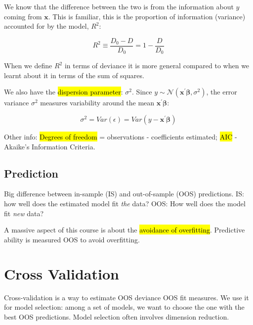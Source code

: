 \documentclass[11pt]{article}
\begin{document}
We know that the difference between the two is from the information about $y$ coming from $\mathbf{x}$. This is familiar, this is the proportion of information (variance) accounted for by the model, $R^2$:

\begin{equation}
    \label{eq:r2}
    R^2 \equiv \dfrac{D_0 - D}{D_0} = 1 - \dfrac{D}{D_0}
\end{equation}

When we define $R^2$ in terms of deviance it is more general compared to when we learnt about it in terms of the sum of squares.

We also have the \hl{dispersion parameter}: $\sigma^2$. Since $y \sim \mathcal{N}(\mathbf{x^\prime}\bm{\beta}, \sigma^2)$, the error variance $\sigma^2$ measures variability around the mean $\mathbf{x^\prime}\bm{\beta}$:

\begin{equation*}
    \sigma^2 = Var(\epsilon) = Var(y - \mathbf{x^\prime}\bm{\beta})
\end{equation*}

\begin{note}
    Other info: \hl{Degrees of freedom} = observations - coefficients estimated; \hl{AIC} - Akaike's Information Criteria.
\end{note}

\subsection{Prediction}
\begin{note}
    Big difference between in-sample (IS) and out-of-sample (OOS) predictions. IS: how well does the estimated model fit \textit{the} data? OOS: How well does the model fit \textit{new} data?
\end{note}

A massive aspect of this course is about the \hl{avoidance of overfitting}. Predictive ability is measured OOS to avoid overfitting.


\newpage
\section{Cross Validation}

Cross-validation is a way to estimate OOS deviance OOS fit measures. We use it for model selection: among a set of models, we want to choose the one with the best OOS predictions. Model selection often involves dimension reduction.
\end{document}
